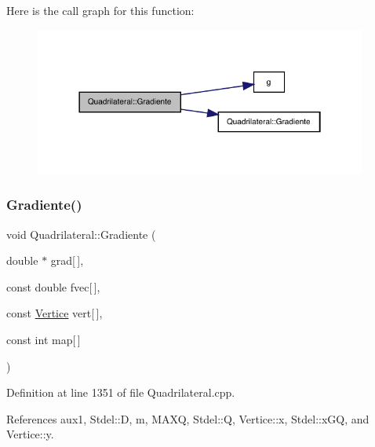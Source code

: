 Here is the call graph for this function\+:
\nopagebreak
\begin{figure}[H]
\begin{center}
\leavevmode
\includegraphics[width=310pt]{classQuadrilateral_a28d6d2bdfb318e828ab1a3471591e602_cgraph}
\end{center}
\end{figure}
\mbox{\label{classQuadrilateral_a1556656fcc885d98259ea162ffd2edfc}} 
\subsubsection{\texorpdfstring{Gradiente()}{Gradiente()}\hspace{0.1cm}{\footnotesize\ttfamily [3/6]}}
{\footnotesize\ttfamily void Quadrilateral\+::\+Gradiente (\begin{DoxyParamCaption}\item[{double $\ast$}]{grad\mbox{[}$\,$\mbox{]},  }\item[{const double}]{fvec\mbox{[}$\,$\mbox{]},  }\item[{const \hyperlink{structVertice}{Vertice}}]{vert\mbox{[}$\,$\mbox{]},  }\item[{const int}]{map\mbox{[}$\,$\mbox{]} }\end{DoxyParamCaption})\hspace{0.3cm}{\ttfamily [virtual]}}



Definition at line 1351 of file Quadrilateral.\+cpp.



References aux1, Stdel\+::D, m, M\+A\+XQ, Stdel\+::Q, Vertice\+::x, Stdel\+::x\+GQ, and Vertice\+::y.

\mbox{\label{classStdel_af3e65d1ad0d59ded925a3f5a9d0fb100}} 
